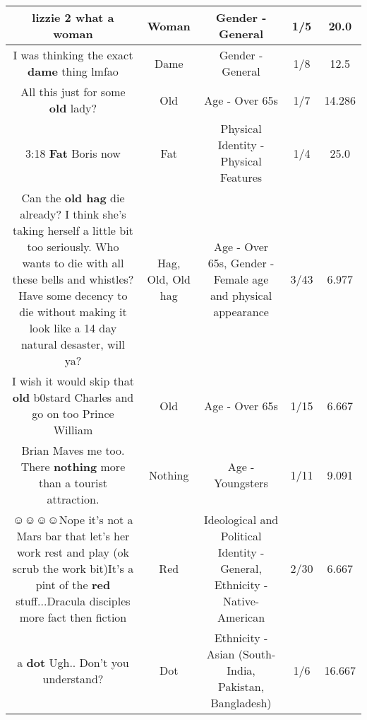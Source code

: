 \documentclass[11pt]{article}
\newlength\mylength
\begin{document}
\begin{center}
\begin{longtable}{|C{.65\mylength}|C{.30\mylength}|C{.12\mylength}|C{.12\mylength}|C{.12\mylength}|}
  \small lizzie 2 what a woman\normalsize   & Woman & Gender - General & 1/5 & 20.0 \\  \hline
  \small I was thinking the exact \textbf{dame} thing lmfao\normalsize   & Dame & Gender - General & 1/8 & 12.5 \\  \hline
  \small All this just for some \textbf{old} lady?\normalsize   & Old & Age - Over 65s & 1/7 & 14.286 \\  \hline
  \small 3:18  \textbf{Fat} Boris now\normalsize   & Fat & Physical Identity - Physical Features & 1/4 & 25.0 \\  \hline
  \small Can the \textbf{o\textbf{ld} h\textbf{ag}} die already? I think she's taking herself a little bit too seriously. Who wants to die with all these bells and whistles? Have some decency to die without making it look like a 14 day natural desaster, will ya?\normalsize   & Hag, Old, Old hag & Age - Over 65s, Gender - Female age and physical appearance & 3/43 & 6.977 \\  \hline
  \small I wish it would skip that \textbf{old} b0stard Charles and go on too Prince William\normalsize   & Old & Age - Over 65s & 1/15 & 6.667 \\  \hline
  \small Brian Maves me too. There \textbf{nothing} more than a tourist attraction.\normalsize   & Nothing & Age - Youngsters & 1/11 & 9.091 \\  \hline
  \small ☺☺☺☺Nope it's not a Mars bar that let's her work rest and play (ok scrub the work bit)It's a pint of the \textbf{r\textbf{ed}} stuff...Dracula disciples more fact then fiction\normalsize   & Red &  Ideological and Political Identity - General, Ethnicity - Native-American & 2/30 & 6.667 \\  \hline
  \small a \textbf{dot} Ugh.. Don't you understand?\normalsize   & Dot & Ethnicity - Asian (South- India, Pakistan, Bangladesh) & 1/6 & 16.667 \\  \hline

\end{longtable}
\end{center}
\end{document}
